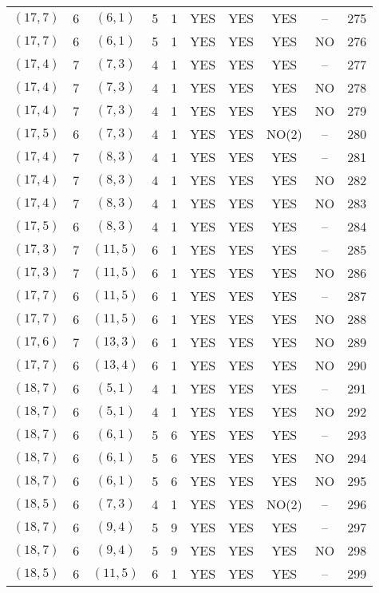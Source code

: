 \begin{longtable}{|c|c|c|c|c|c|c|c|c|c|}
$(17, 7)$ & 6 & $(6, 1)$ & 5 & 1 & YES & YES & YES & -- & 275\\
$(17, 7)$ & 6 & $(6, 1)$ & 5 & 1 & YES & YES & YES & NO & 276\\
$(17, 4)$ & 7 & $(7, 3)$ & 4 & 1 & YES & YES & YES & -- & 277\\
$(17, 4)$ & 7 & $(7, 3)$ & 4 & 1 & YES & YES & YES & NO & 278\\
$(17, 4)$ & 7 & $(7, 3)$ & 4 & 1 & YES & YES & YES & NO & 279\\
$(17, 5)$ & 6 & $(7, 3)$ & 4 & 1 & YES & YES & NO(2) & -- & 280\\
$(17, 4)$ & 7 & $(8, 3)$ & 4 & 1 & YES & YES & YES & -- & 281\\
$(17, 4)$ & 7 & $(8, 3)$ & 4 & 1 & YES & YES & YES & NO & 282\\
$(17, 4)$ & 7 & $(8, 3)$ & 4 & 1 & YES & YES & YES & NO & 283\\
$(17, 5)$ & 6 & $(8, 3)$ & 4 & 1 & YES & YES & YES & -- & 284\\
$(17, 3)$ & 7 & $(11, 5)$ & 6 & 1 & YES & YES & YES & -- & 285\\
$(17, 3)$ & 7 & $(11, 5)$ & 6 & 1 & YES & YES & YES & NO & 286\\
$(17, 7)$ & 6 & $(11, 5)$ & 6 & 1 & YES & YES & YES & -- & 287\\
$(17, 7)$ & 6 & $(11, 5)$ & 6 & 1 & YES & YES & YES & NO & 288\\
$(17, 6)$ & 7 & $(13, 3)$ & 6 & 1 & YES & YES & YES & NO & 289\\
$(17, 7)$ & 6 & $(13, 4)$ & 6 & 1 & YES & YES & YES & NO & 290\\
$(18, 7)$ & 6 & $(5, 1)$ & 4 & 1 & YES & YES & YES & -- & 291\\
$(18, 7)$ & 6 & $(5, 1)$ & 4 & 1 & YES & YES & YES & NO & 292\\
$(18, 7)$ & 6 & $(6, 1)$ & 5 & 6 & YES & YES & YES & -- & 293\\
$(18, 7)$ & 6 & $(6, 1)$ & 5 & 6 & YES & YES & YES & NO & 294\\
$(18, 7)$ & 6 & $(6, 1)$ & 5 & 6 & YES & YES & YES & NO & 295\\
$(18, 5)$ & 6 & $(7, 3)$ & 4 & 1 & YES & YES & NO(2) & -- & 296\\
$(18, 7)$ & 6 & $(9, 4)$ & 5 & 9 & YES & YES & YES & -- & 297\\
$(18, 7)$ & 6 & $(9, 4)$ & 5 & 9 & YES & YES & YES & NO & 298\\
$(18, 5)$ & 6 & $(11, 5)$ & 6 & 1 & YES & YES & YES & -- & 299\\

\end{longtable}
